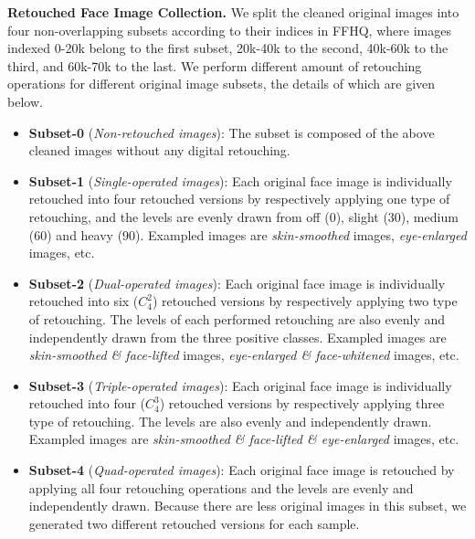\documentclass[sigconf]{acmart}
\begin{document}

\noindent\textbf{Retouched Face Image Collection.}
We split the cleaned original images into four non-overlapping subsets according to their indices in FFHQ, where images indexed 0-20k belong to the first subset, 20k-40k to the second, 40k-60k to the third, and 60k-70k to the last. 
We perform different amount of retouching operations for different original image subsets, the details of which are given below.
\begin{itemize}
\item \textbf{Subset-0} (\textit{Non-retouched images}): The subset is composed of the above cleaned images without any digital retouching.
\item \textbf{Subset-1} (\textit{Single-operated images}): Each original face image is individually retouched into four retouched versions by respectively applying one type of retouching, and the levels are evenly drawn from off (0), slight (30), medium (60) and heavy (90). Exampled images are \textit{skin-smoothed} images, \textit{eye-enlarged} images, etc. 
\item \textbf{Subset-2} (\textit{Dual-operated images}): Each original face image is individually retouched into six ($C_4^2$) retouched versions by respectively applying two type of retouching.
The levels of each performed retouching are also evenly and independently drawn from the three positive classes. Exampled images are \textit{skin-smoothed \& face-lifted} images, \textit{eye-enlarged \& face-whitened} images, etc. 
\item \textbf{Subset-3} (\textit{Triple-operated images}): Each original face image is individually retouched into four ($C_4^3$) retouched versions by respectively applying three type of retouching.
The levels are also evenly and independently drawn. Exampled images are \textit{skin-smoothed \& face-lifted \& eye-enlarged} images, etc. 
\item \textbf{Subset-4} (\textit{Quad-operated images}): Each original face image is retouched by applying all four retouching operations and the levels are evenly and independently drawn.
Because there are less original images in this subset, we generated two different retouched versions for each sample.
\end{itemize}
\end{document}
